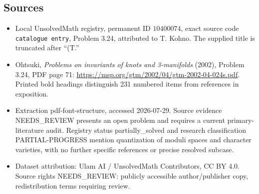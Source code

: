 \documentclass[11pt]{article}
\begin{document}
\subsection{Sources}
\begin{itemize}
\item Local UnsolvedMath registry, permanent ID \(10400074\), exact source code \texttt{catalogue entry}, Problem 3.24, attributed to T. Kohno. The supplied title is truncated after ``(T.''
\item Ohtsuki, \emph{Problems on invariants of knots and 3-manifolds} (2002), Problem 3.24, PDF page 71: \url{https://msp.org/gtm/2002/04/gtm-2002-04-024s.pdf}. Printed bold headings distinguish 231 numbered items from references in exposition.
\item Extraction pdf-font-structure, accessed 2026-07-29. Source evidence NEEDS\_REVIEW presents an open problem and requires a current primary-literature audit. Registry status partially\_solved and research classification PARTIAL-PROGRESS mention quantization of moduli spaces and character varieties, with no further specific references or precise resolved subcase.
\item Dataset attribution: Ulam AI / UnsolvedMath Contributors, CC BY 4.0. Source rights NEEDS\_REVIEW: publicly accessible author/publisher copy, redistribution terms requiring review.
\end{itemize}
\end{document}
